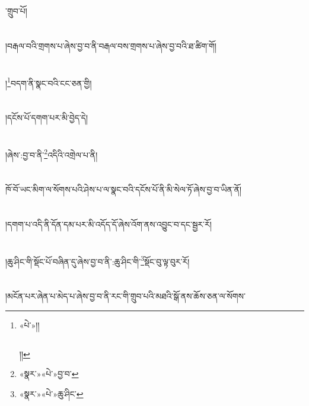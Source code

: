 ་གྲུབ་པོ།\chapter{ }།བརྒལ་བའི་གྲགས་པ་ཞེས་བྱ་བ་ནི་བརྒལ་བས་གྲགས་པ་ཞེས་བྱ་བའི་ཐ་ཚིག་གོ།\chapter{ }།\footnote{«པེ་»།།\chapter{ }།།}བདག་ནི་སྣང་བའི་ངང་ཅན་གྱི།\chapter{ }།དངོས་པོ་དགག་པར་མི་བྱེད་དེ།\chapter{ }།ཞེས་:བྱ་བ་ནི་\footnote{«སྣར་»«པེ་»བྱ་བ་}འདིའི་འགྲེལ་པ་ནི།\chapter{ }ཁོ་བོ་ཡང་མིག་ལ་སོགས་པའི་ཤེས་པ་ལ་སྣང་བའི་དངོས་པོ་ནི་མི་སེལ་ཏོ་ཞེས་བྱ་བ་ཡིན་ནོ།\chapter{ }།དགག་པ་འདི་ནི་དོན་དམ་པར་མི་འདོད་དོ་ཞེས་འོག་ནས་འབྱུང་བ་དང་སྦྱར་རོ།\chapter{ }།ཆུ་ཤིང་གི་སྡོང་པོ་བཞིན་དུ་ཞེས་བྱ་བ་ནི་:ཆུ་ཤིང་གི་\footnote{«སྣར་»«པེ་»ཆུ་ཤིང་}སྡོང་བུ་ལྟ་བུར་རོ།\chapter{ }།མངོན་པར་ཞེན་པ་མེད་པ་ཞེས་བྱ་བ་ནི་རང་གི་གྲུབ་པའི་མཐའི་སྒོ་ནས་ཆོས་ཅན་ལ་སོགས་
